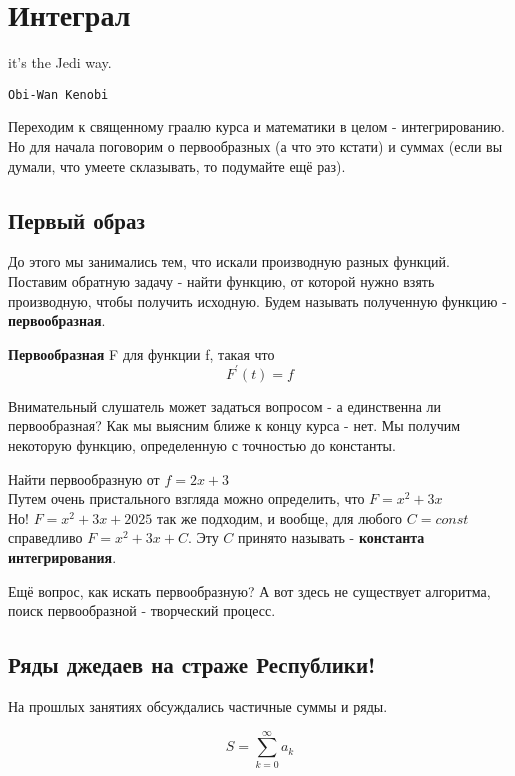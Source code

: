 \section{Интеграл}
\epigraph{\textsf{it’s the Jedi way.}}{\texttt{Obi-Wan Kenobi}}
Переходим к священному граалю курса и математики в целом - интегрированию. Но для начала поговорим о первообразных (а что это кстати) и суммах (если вы думали, что умеете склазывать, то подумайте ещё раз). 

\subsection{Первый образ}
До этого мы занимались тем, что искали производную разных функций. Поставим обратную задачу - найти функцию, от которой нужно взять производную, чтобы получить исходную. Будем называть полученную функцию - \textbf{первообразная}.

\begin{definition}
    \textbf{Первообразная} F для функции f, такая что 
    \begin{equation*}
        F^{'}(t) = f
    \end{equation*}
\end{definition}

Внимательный слушатель может задаться вопросом - а единственна ли первообразная? Как мы выясним ближе к концу курса - нет. Мы получим некоторую функцию, определенную с точностью до константы.

\begin{example}
    Найти первообразную от $f =  2x + 3$\\
    Путем очень пристального взгляда можно определить, что $F = x^2 + 3x$\\
    Но! $F = x^2 + 3x + 2025$ так же подходим, и  вообще, для любого $C = const$ справедливо $F = x^2 + 3x + C$. Эту $C$ принято называть - \textbf{константа интегрирования}.
\end{example}

Ещё вопрос, как искать первообразную? А вот здесь не существует алгоритма, поиск первообразной - творческий процесс.

\subsection{Ряды джедаев на страже Республики!}

На прошлых занятиях обсуждались частичные суммы и ряды. 

\begin{equation*}
       S = \sum_{k = 0}^{\infty} a_k
\end{equation*}

